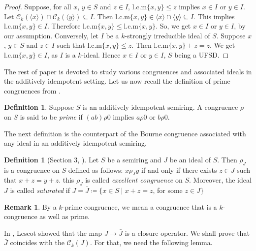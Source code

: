 \documentclass[11pt,english]{amsart}
\theoremstyle{definition}
\newtheorem{definition}[theorem]{Definition}
\newtheorem{remark}[theorem]{Remark}
\numberwithin{equation}{section}
\begin{document}
\begin{proof}
    Suppose, for all $x$, $y \in S$ and $z \in I$, $\mathrm{l.c.m}\{x,y\} \leqslant z$ implies $x \in I$ or $y \in I$. Let $\mathcal{C}_k(\langle x \rangle) \cap \mathcal{C}_k(\langle y \rangle) \subseteq I$. Then $\mathrm{l.c.m}\{x,y\} \in \langle x \rangle \cap \langle y \rangle \subseteq I$. This implies $\mathrm{l.c.m}\{x,y\} \in I$. Therefore $\mathrm{l.c.m}\{x,y\} \leqslant \mathrm{l.c.m}\{x,y\}$. So, we get $x \in I$ or $y \in I$, by our assumption. 
    Conversely, let $I$ be a $k$-strongly irreducible ideal of $S$. Suppose $x$, $y \in S$ and $z \in I$ such that $\mathrm{l.c.m}\{x,y\} \leqslant z$. Then $\mathrm{l.c.m}\{x,y\} + z = z$. We get $\mathrm{l.c.m}\{x,y\} \in I$, as $I$ is a $k$-ideal. Hence $x \in I$ or $y \in I$, $S$ being a UFSD.
\end{proof}

The rest of paper is devoted to study various congruences and associated ideals in the additively idempotent setting. Let us now recall the definition of prime congruences from  \cite[Definition 3.4]{Lescot11}.

 \begin{definition}
     Suppose $S$ is an additively idempotent semiring. A congruence $\rho$ on $S$ is said to be \emph{prime} if $(ab) \rho 0$ implies $a \rho 0$ or $b \rho 0$. 
 \end{definition}
 
 The next definition is the counterpart of the Bourne congruence associated with any ideal in an additively idempotent semiring. 
 
 \begin{definition}[Section 3, \cite{Lescot11}]\label{Def: excellent congruences and saturated ideals}
     Let $S$ be a semiring and $J$ be an ideal of $S$. Then $\rho_J$ is a congruence on $S$ defined as follows: $x\rho_Jy$ if and only if there exists $z\in J$ such that $x+z=y+z$. this $\rho_J$ is called \emph{excellent congruence} on $S$. Moreover, the ideal $J$ is called \emph{saturated} if $J=\bar{J}\coloneqq \{x\in S \mid x+z=z$, for some $z\in J\}$
 \end{definition}

 \begin{remark}
 By a $k$-prime congruence, we mean a congruence that is a $k$-congruence as well as prime.    
 \end{remark}

     In \cite[Theorem 3.7]{Lescot11}, Lescot showed that the map $J\to \bar{J}$ is a closure operator. We shall prove that $\bar{J}$ coincides with the $\mathcal{C}_k(J)$. For that, we need the following lemma. 
 
\end{document}
